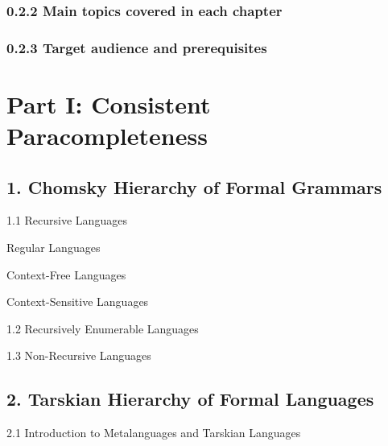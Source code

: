 \hypertarget{main-topics-covered-in-each-chapter}{%
\subsubsection*{0.2.2 Main topics covered in each
chapter}\label{main-topics-covered-in-each-chapter}}

\hypertarget{target-audience-and-prerequisites}{%
\subsubsection*{0.2.3 Target audience and
prerequisites}\label{target-audience-and-prerequisites}}

\hypertarget{part-i-consistent-paracompleteness}{%
\section*{Part I: Consistent
Paracompleteness}\label{part-i-consistent-paracompleteness}}

\hypertarget{chomsky-hierarchy-of-formal-grammars}{%
\subsection*{1. Chomsky Hierarchy of Formal
Grammars}\label{chomsky-hierarchy-of-formal-grammars}}

1.1 Recursive Languages

Regular Languages

Context-Free Languages

Context-Sensitive Languages

1.2 Recursively Enumerable Languages

1.3 Non-Recursive Languages

\hypertarget{tarskian-hierarchy-of-formal-languages}{%
\subsection*{2. Tarskian Hierarchy of Formal
Languages}\label{tarskian-hierarchy-of-formal-languages}}

2.1 Introduction to Metalanguages and Tarskian Languages

